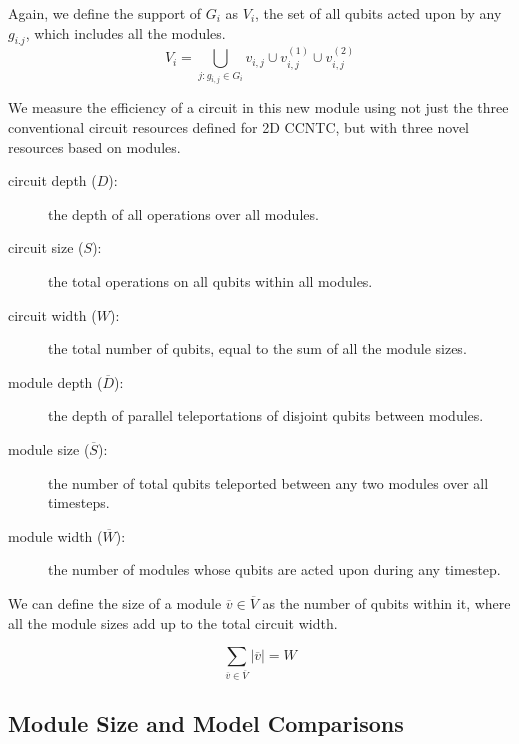 \begin{definition}
\begin{itemize}
Again, we define the support of $G_i$
as $V_i$, the set of all qubits acted upon by any $g_{i.j}$, which
includes all the modules.
\begin{equation}
V_i = \bigcup_{j: g_{i,j} \in G_i} v_{i,j} \cup v^{(1)}_{i,j} \cup v^{(2)}_{i,j} 
\end{equation}

\end{itemize}
\end{definition}

We measure the efficiency of a circuit in this new module using not just
the three conventional circuit resources defined for \textsf{2D CCNTC}, but with three novel resources
based on modules.

\begin{description}

\item[circuit depth ($D$):] the depth of all operations over all modules.
\item[circuit size ($S$):] the total operations on all qubits within all
modules.
\item[circuit width ($W$):] the total number of qubits, equal to the sum of all the module sizes.
\item[module depth ($\overline{D}$):] the depth of parallel teleportations
of disjoint qubits between modules.
\item[module size ($\overline{S}$):] the number of total qubits teleported between any two modules over all timesteps.
\item[module width ($\overline{W}$):] the number of modules whose qubits are
acted upon during any timestep.

\end{description}

We can define the size of a module $\overline{v} \in \overline{V}$
as the number of qubits within it,
where all the module sizes add up to the total circuit width.

\begin{equation}
\sum_{\overline{v} \in \overline{V}} |\overline{v}| = W
\end{equation}

\subsection{Module Size and Model Comparisons}
\label{subsec:module-compare}

